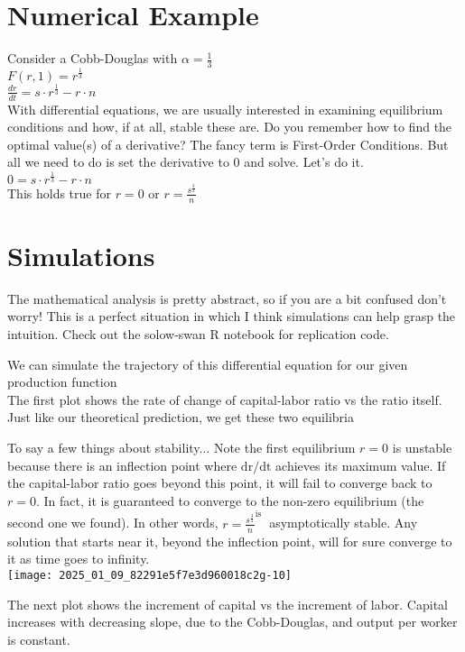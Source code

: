 \documentclass[10pt]{article}
\begin{document}
\section*{Numerical Example}
Consider a Cobb-Douglas with $\alpha=\frac{1}{3}$\\
$F(r, 1)=r^{\frac{1}{3}}$\\
$\frac{d r}{d t}=s \cdot r^{\frac{1}{3}}-r \cdot n$\\
With differential equations, we are usually interested in examining equilibrium conditions and how, if at all, stable these are. Do you remember how to find the optimal value(s) of a derivative? The fancy term is First-Order Conditions. But all we need to do is set the derivative to 0 and solve. Let's do it.\\
$0=s \cdot r^{\frac{1}{3}}-r \cdot n$\\
This holds true for $r=0$ or $r=\frac{s^{\frac{3}{2}}}{n}$

\section*{Simulations}
The mathematical analysis is pretty abstract, so if you are a bit confused don't worry! This is a perfect situation in which I think simulations can help grasp the intuition. Check out the solow-swan R notebook for replication code.

We can simulate the trajectory of this differential equation for our given production function\\
The first plot shows the rate of change of capital-labor ratio vs the ratio itself. Just like our theoretical prediction, we get these two equilibria

To say a few things about stability... Note the first equilibrium $r=0$ is unstable because there is an inflection point where $\mathrm{dr} / \mathrm{dt}$ achieves its maximum value. If the capital-labor ratio goes beyond this point, it will fail to converge back to $r=0$. In fact, it is guaranteed to converge to the non-zero equilibrium (the second one we found). In other words, $r={\frac{s^{\frac{3}{2}}}{n}}^{\text {is }}$ asymptotically stable. Any solution that starts near it, beyond the inflection point, will for sure converge to it as time goes to infinity.\\
\texttt{[image: 2025\_01\_09\_82291e5f7e3d960018c2g-10]}

The next plot shows the increment of capital vs the increment of labor. Capital increases with decreasing slope, due to the Cobb-Douglas, and output per worker is constant.
\end{document}
